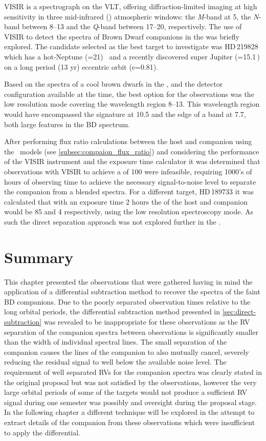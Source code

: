 {VISIR} is a \mir{} spectrograph on the {VLT}, offering diffraction-limited imaging at high sensitivity in three mid-infrared (\mir) atmospheric windows: the \emph{M}-band at 5\um{}, the \emph{N}-band between 8--13\um{} and the \emph{Q}-band between 17--20\um{}, respectively.
The use of {VISIR} to detect the spectra of Brown Dwarf companions in the {\mir{}} was briefly explored.
The candidate selected as the best target to investigate was {HD\,219828} which has a hot-Neptune (\Mtwosini{}=21\Mearth)~\citep{melo_new_2007} and a recently discovered super Jupiter (\Mtwosini{}=15.1\,\Mjup) on a long period (13 yr) eccentric orbit (e=0.81)\citep{santos_extreme_2016}.

Based on the spectra of a cool brown dwarfs in the \mir{}, and the detector configuration available at the time, the best option for the observations was the low resolution mode covering the wavelength region 8--13\um{}.
This wavelength region would have encompassed the  signature at 10.5\um{} and the edge of a  band at 7.7\um{}, both large features in the {BD} \mir{} spectrum.

After performing flux ratio calculations between the host and companion using the~\citet{baraffe_evolutionary_2003} models (see \cref{subsec:compaion_flux_ratio}) and considering the performance of the {VISIR} instrument and the exposure time calculator it was determined that observations with {VISIR} to achieve a \snr{} of 100 were infeasible, requiring 1000's of hours of observing time to achieve the necessary signal-to-noise level to separate the companion from a blended spectra.
For a different target, {HD\,189733} it was calculated that with an exposure time 2 hours the \snr{} of the host and companion would be 85 and 4 respectively, using the low resolution spectroscopy mode.
As such the direct separation approach was not explored further in the \mir{}.


\section{Summary}
This chapter presented the observations that were gathered having in mind the application of a differential subtraction method to recover the spectra of the faint {BD} companions.
Due to the poorly separated observation times relative to the long orbital periods, the differential subtraction method presented in \cref{sec:direct-subtraction} was revealed to be inappropriate for these observations as the {RV} separation of the companion spectra between observations is significantly smaller than the width of individual spectral lines.
The small separation of the companion causes the lines of the companion to also mutually cancel, severely reducing the residual signal to well below the available noise level.
The requirement of well separated {RV}s for the companion spectra was clearly stated in the original proposal but was not satisfied by the observations, however the very large orbital periods of some of the targets would not produce a sufficient {RV} signal during one semester was possibly and oversight during the proposal stage.
In the following chapter a different technique will be explored in the attempt to extract details of the companion from these observations which were insufficient to apply the differential.
